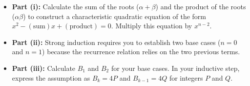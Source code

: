 \begin{hint}
\begin{itemize}[leftmargin=*]
    \item \textbf{Part (i):} Calculate the sum of the roots ($\alpha + \beta$) and the product of the roots ($\alpha\beta$) to construct a characteristic quadratic equation of the form $x^2 - (\text{sum})x + (\text{product}) = 0$. Multiply this equation by $x^{n-2}$.
    \item \textbf{Part (ii):} Strong induction requires you to establish two base cases ($n=0$ and $n=1$) because the recurrence relation relies on the two previous terms.
    \item \textbf{Part (iii):} Calculate $B_1$ and $B_2$ for your base cases. In your inductive step, express the assumption as $B_k = 4P$ and $B_{k-1} = 4Q$ for integers $P$ and $Q$.
\end{itemize}
\end{hint}

